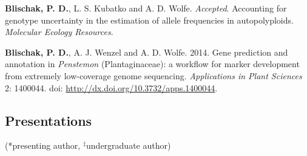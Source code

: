 \documentclass[]{article}
\begin{document}
\begin{etaremune}

\item
  \textbf{Blischak, P. D.}, L. S. Kubatko and A. D. Wolfe. \emph{Accepted}.
  Accounting for genotype uncertainty in the estimation of allele
  frequencies in autopolyploids. \emph{Molecular Ecology Resources}.
\item
  \textbf{Blischak, P. D.}, A. J. Wenzel and A. D. Wolfe. 2014. Gene
  prediction and annotation in \textit{Penstemon} (Plantaginaceae): a
  workflow for marker development from extremely low-coverage genome
  sequencing. \emph{Applications in Plant Sciences} 2: 1400044. doi:
  \href{http://dx.doi.org/10.3732/apps.1400044}{\url{http://dx.doi.org/10.3732/apps.1400044}}.
\end{etaremune}

\subsection{\texorpdfstring{\textbf{Presentations}}{Presentations}}\label{presentations}

(*presenting author, \(^{\ddagger}\)undergraduate author)
\end{document}
